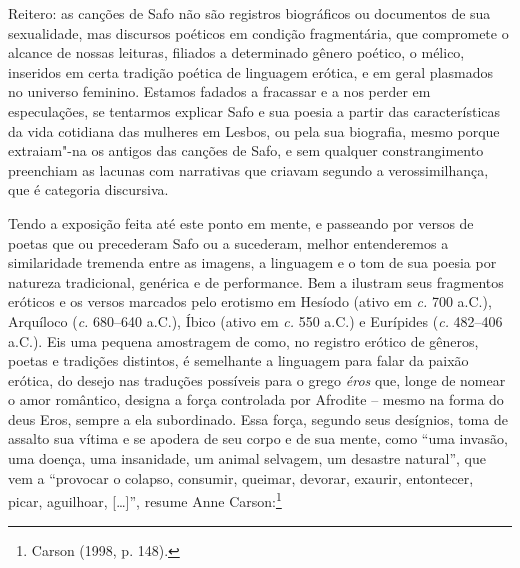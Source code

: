 Reitero: as canções de Safo não
são registros biográficos ou documentos de sua sexualidade, mas discursos
poéticos em condição fragmentária, que compromete o alcance de nossas leituras,
filiados a determinado gênero poético, o mélico, inseridos em certa tradição
poética de linguagem erótica, e em geral plasmados no universo feminino. Estamos fadados a fracassar e a nos perder em
especulações, se tentarmos explicar Safo e sua poesia a partir das
características da vida cotidiana das mulheres em Lesbos, ou pela sua
biografia, mesmo porque extraiam"-na os antigos das canções de Safo, e
sem qualquer constrangimento preenchiam as lacunas com narrativas
que criavam segundo a verossimilhança, que é categoria discursiva.

Tendo a exposição feita até este ponto em mente, e passeando por versos de poetas que ou precederam Safo ou
a sucederam, melhor entenderemos a similaridade tremenda entre as imagens, a
linguagem e o tom de sua poesia por natureza tradicional, genérica e de performance. Bem a ilustram seus fragmentos eróticos e os versos marcados pelo
erotismo em Hesíodo (ativo em \textit{c.} 700 a.C.), Arquíloco (\textit{c.} 680--640
a.C.), Íbico (ativo em \textit{c.} 550 a.C.) e Eurípides (\textit{c.} 482--406 a.C.). Eis
uma pequena amostragem de como, no registro erótico de gêneros, poetas e
tradições distintos, é semelhante a linguagem para falar da paixão erótica, do
desejo nas traduções possíveis para o grego \textit{éros} que, longe de nomear
o amor romântico, designa a força controlada por Afrodite -- mesmo na forma do
deus Eros, sempre a ela subordinado. Essa força, segundo seus desígnios, toma de
assalto sua vítima e se apodera de seu corpo e de sua mente, como “uma invasão,
uma doença, uma insanidade, um animal selvagem, um desastre natural”, que vem a
“provocar o colapso, consumir, queimar, devorar, exaurir, entontecer, picar,
aguilhoar, [\ldots{}]”, resume Anne Carson:\footnote{ Carson (1998, p. 148).}

